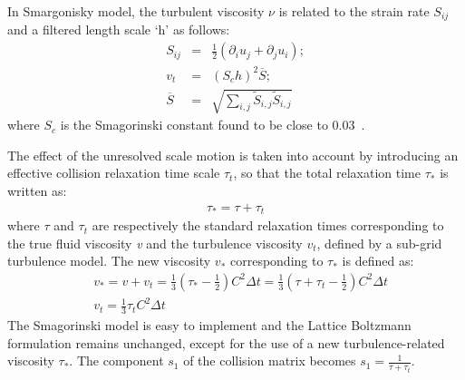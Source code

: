 In Smargonisky model, the turbulent viscosity $\nu$ is related to the strain rate $S_{ij}$ and a filtered length scale `h' as follows:
\begin{align}
S_{ij} & = &\frac{1}{2}(\partial_i u_j + \partial_j u_i); \\
\mathit{v}_{\mathit{t}} & = & (\mathit{S}_{c}\mathit{h})^{2}\overline{S}; \\
\overline{S} & = & \sqrt{\sum\limits_{\mathit{i,j}}{\tilde{S}_{\mathit{i,j}}\tilde{S}_{\mathit{i,j}}}}
\end{align}
where $\mathit{S}_{c}$ is the Smagorinski constant found to be close to 0.03~\citep{yu2005}. 

The effect of the unresolved scale motion is taken into account by introducing an effective collision relaxation time scale $\tau_{t}$, so that the total relaxation time $\tau_{*}$ is written as:
\begin{align}
\tau_{*}=\tau + \tau_{t}
\end{align} 
where $\tau$ and $\tau_{t}$ are respectively the standard relaxation times corresponding to the true fluid viscosity \textit{v} and the turbulence viscosity $\mathit{v}_{\mathit{t}}$, defined by a sub-grid turbulence model. The new viscosity $\mathit{v}_{*}$ corresponding to $\tau_{*}$ is defined as:
\begin{align}
& \mathit{v}_{*}=\mathit{v}+\mathit{v}_{\mathit{t}}=\frac{1}{3}(\tau_{*}-\frac{1}{2})\mathit{C}^{2} \Delta \mathit{t} =\frac{1}{3}(\tau+\tau_{t}-\frac{1}{2})\mathit{C}^{2} \Delta \mathit{t}  \\
& \mathit{v}_{\mathit{t}}=\frac{1}{3}\tau_{\mathit{t}}\mathit{C}^{2} \Delta \textit{t}
\end{align} 
The Smagorinski model is easy to implement and the Lattice Boltzmann formulation remains unchanged, except for the use of a new turbulence-related viscosity $\tau_{*}$. The component $s_1$ of the collision matrix becomes $s_1 = \frac{1}{\tau+\tau_t}$.
